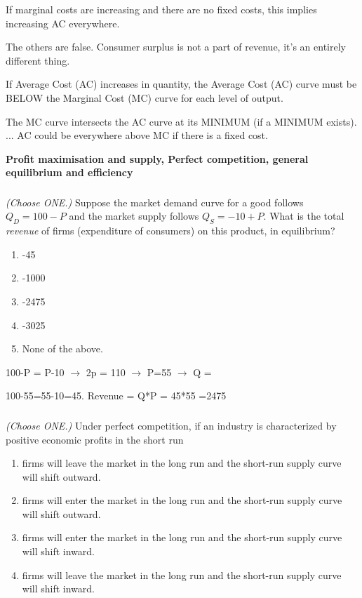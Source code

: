 \documentclass[]{article}
\begin{document}
If marginal costs are increasing and there are no fixed costs, this
implies increasing AC everywhere.

The others are false. Consumer surplus is not a part of revenue, it's an
entirely different thing.

If Average Cost (AC) increases in quantity, the Average Cost (AC) curve
must be BELOW the Marginal Cost (MC) curve for each level of output.

The MC curve intersects the AC curve at its MINIMUM (if a MINIMUM
exists). ... AC could be everywhere above MC if there is a fixed cost.

\textbf{Profit maximisation and supply, Perfect competition, general
equilibrium and efficiency}

\hypertarget{section-17}{%
\subsubsection{}\label{section-17}}

\emph{(Choose ONE.)} Suppose the market demand curve for a good follows
\(Q_D = 100 - P\) and the market supply follows \(Q_S = -10 + P\). What
is the total \emph{revenue} of firms (expenditure of consumers) on this
product, in equilibrium?

\begin{enumerate}
\def\labelenumi{\Alph{enumi}.}
\item
  -45
\item
  -1000
\item
  -2475
\item
  -3025
\item
  None of the above.
\end{enumerate}

100-P = P-10 \(\rightarrow\) 2p = 110 \(\rightarrow\) P=55
\(\rightarrow\) Q =

100-55=55-10=45. Revenue = Q*P = 45*55 =2475

\hypertarget{section-18}{%
\subsubsection{}\label{section-18}}

\emph{(Choose ONE.)} Under perfect competition, if an industry is
characterized by positive economic profits in the short run

\begin{enumerate}
\def\labelenumi{\Alph{enumi}.}
\item
  firms will leave the market in the long run and the short-run supply
  curve will shift outward.
\item
  firms will enter the market in the long run and the short-run supply
  curve will shift outward.
\item
  firms will enter the market in the long run and the short-run supply
  curve will shift inward.
\item
  firms will leave the market in the long run and the short-run supply
  curve will shift inward.
\end{enumerate}
\end{document}
